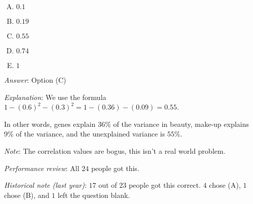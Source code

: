 \documentclass[10pt]{amsart}
\begin{document}
\begin{enumerate}
  \begin{enumerate}[(A)]
  \item $0.1$
  \item $0.19$
  \item $0.55$
  \item $0.74$
  \item $1$
  \end{enumerate}

  {\em Answer}: Option (C)

  {\em Explanation}: We use the formula $1 - (0.6)^2 - (0.3)^2 = 1 -
  (0.36) - (0.09) = 0.55$.

  In other words, genes explain $36\%$ of the variance in beauty,
  make-up explains $9\%$ of the variance, and the unexplained variance
  is $55\%$.

  {\em Note}: The correlation values are bogus, this isn't a real
  world problem.

  {\em Performance review}: All $24$ people got this.

  {\em Historical note (last year)}: $17$ out of $23$ people got this
  correct. $4$ chose (A), $1$ chose (B), and $1$ left the question
  blank.
\end{enumerate}
\end{document}
